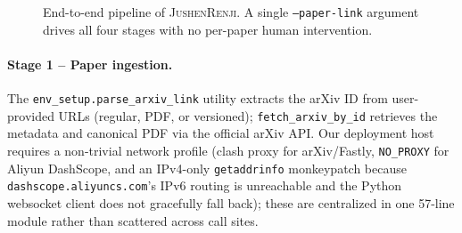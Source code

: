 \documentclass[11pt,a4paper]{article}
\begin{document}
\begin{figure}[t]
\centering
\caption{End-to-end pipeline of \textsc{JushenRenji}. A single \texttt{--paper-link} argument drives all four stages with no per-paper human intervention.}
\label{fig:pipeline}
\end{figure}

\paragraph{Stage 1 -- Paper ingestion.}
The \texttt{env\_setup.parse\_arxiv\_link} utility extracts the arXiv ID from user-provided URLs (regular, PDF, or versioned); \texttt{fetch\_arxiv\_by\_id} retrieves the metadata and canonical PDF via the official arXiv API. Our deployment host requires a non-trivial network profile (clash proxy for arXiv/Fastly, \texttt{NO\_PROXY} for Aliyun DashScope, and an IPv4-only \texttt{getaddrinfo} monkeypatch because \texttt{dashscope.aliyuncs.com}'s IPv6 routing is unreachable and the Python websocket client does not gracefully fall back); these are centralized in one 57-line module rather than scattered across call sites.
\end{document}
